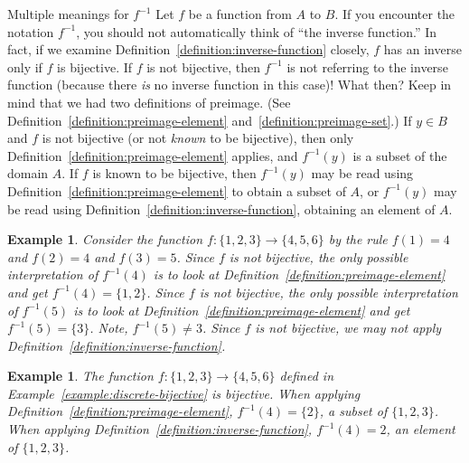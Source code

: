 \documentclass{book}
\newcounter{ekcounter}%
\theoremstyle{ekimcustom}
\newtheorem{example}[ekcounter]{Example}
\begin{document}
\begin{bwarning}{Multiple meanings for $f^{-1}$}{}%
Let $f$ be a function from $A$ to $B$. If you encounter the notation $f^{-1}$, you should not automatically think of ``the inverse function.'' In fact, if we examine Definition~\ref{definition:inverse-function} closely, $f$ has an inverse only if $f$ is bijective. If $f$ is not bijective, then $f^{-1}$ is not referring to the inverse function (because there \emph{is} no inverse function in this case)!
\vskip6pt
What then? Keep in mind that we had two definitions of preimage. (See Definition~\ref{definition:preimage-element} and~\ref{definition:preimage-set}.) If $y \in B$ and $f$ is not bijective (or not \emph{known} to be bijective), then only Definition~\ref{definition:preimage-element} applies, and $f^{-1}(y)$ is a subset of the domain $A$. If $f$ is known to be bijective, then $f^{-1}(y)$ may be read using Definition~\ref{definition:preimage-element} to obtain a subset of $A$, or $f^{-1}(y)$ may be read using Definition~\ref{definition:inverse-function}, obtaining an element of $A$.
\end{bwarning}
\begin{example}
Consider the function $f : \{1,2,3\} \to \{4,5,6\}$ by the rule $f(1)=4$ and $f(2)=4$ and $f(3)=5$.
Since $f$ is not bijective, the only possible interpretation of $f^{-1}(4)$ is to look at Definition~\ref{definition:preimage-element} and get $f^{-1}(4)=\{1,2\}$.
Since $f$ is not bijective, the only possible interpretation of $f^{-1}(5)$ is to look at Definition~\ref{definition:preimage-element} and get $f^{-1}(5)=\{3\}$. Note, $f^{-1}(5) \not= 3$.
Since $f$ is not bijective, we may not apply Definition~\ref{definition:inverse-function}.
\end{example}
\begin{example}
The function $f : \{1,2,3\} \to \{4,5,6\}$ defined in Example~\ref{example:discrete-bijective} is bijective.
When applying Definition~\ref{definition:preimage-element}, $f^{-1}(4) = \{2\}$, a subset of $\{1,2,3\}$.
When applying Definition~\ref{definition:inverse-function}, $f^{-1}(4)=2$, an element of $\{1,2,3\}$.
\end{example}
\end{document}
